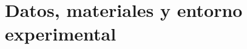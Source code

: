 \documentclass[../MAIN.tex]{subfiles}
\begin{document}
	
	
	\section{Datos, materiales y entorno experimental}
	
	
\end{document}
